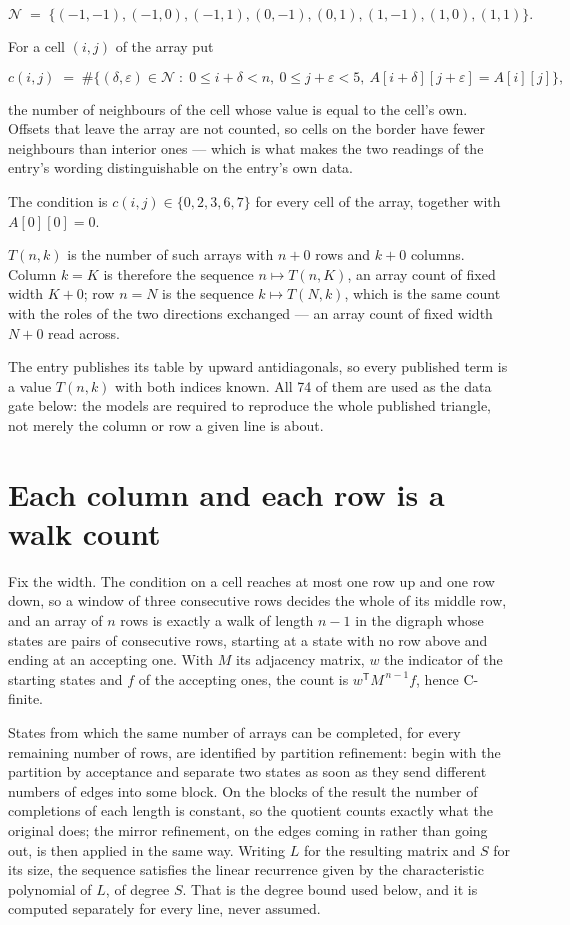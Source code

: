 \documentclass[11pt]{article}
\theoremstyle{definition}
\begin{document}
\[\mathcal{N} \;=\; \{(-1,-1), (-1,0), (-1,1), (0,-1), (0,1), (1,-1), (1,0), (1,1)\}.\]

For a cell $(i,j)$ of the array put

\[c(i,j) \;=\; \#\bigl\{(\delta,\varepsilon)\in\mathcal{N} \;:\; 0\le i+\delta<n,\ 0\le j+\varepsilon<5,\ A[i+\delta][j+\varepsilon] = A[i][j]\bigr\},\]

the number of neighbours of the cell whose value is equal to the cell's own. Offsets that leave the array are not counted, so cells on the border have fewer neighbours than interior ones --- which is what makes the two readings of the entry's wording distinguishable on the entry's own data.

The condition is $c(i,j) \in \{0, 2, 3, 6, 7\}$ for every cell of the array, together with $A[0][0]=0$.

$T(n,k)$ is the number of such arrays with $n + 0$ rows and $k + 0$ columns. Column $k = K$ is therefore the sequence $n \mapsto T(n,K)$, an array count of fixed width $K + 0$; row $n = N$ is the sequence $k \mapsto T(N,k)$, which is the same count with the roles of the two directions exchanged --- an array count of fixed width $N + 0$ read across.

The entry publishes its table by upward antidiagonals, so every published term is a value $T(n,k)$ with both indices known. All 74 of them are used as the data gate below: the models are required to reproduce the whole published triangle, not merely the column or row a given line is about.

\section{Each column and each row is a walk count}

Fix the width. The condition on a cell reaches at most one row up and one row down, so a window of three consecutive rows decides the whole of its middle row, and an array of $n$ rows is exactly a walk of length $n-1$ in the digraph whose states are pairs of consecutive rows, starting at a state with no row above and ending at an accepting one. With $M$ its adjacency matrix, $w$ the indicator of the starting states and $f$ of the accepting ones, the count is $w^{\mathsf T}M^{\,n-1}f$, hence C-finite.

States from which the same number of arrays can be completed, for every remaining number of rows, are identified by partition refinement: begin with the partition by acceptance and separate two states as soon as they send different numbers of edges into some block. On the blocks of the result the number of completions of each length is constant, so the quotient counts exactly what the original does; the mirror refinement, on the edges coming in rather than going out, is then applied in the same way. Writing $L$ for the resulting matrix and $S$ for its size, the sequence satisfies the linear recurrence given by the characteristic polynomial of $L$, of degree $S$. That is the degree bound used below, and it is computed separately for every line, never assumed.
\end{document}
